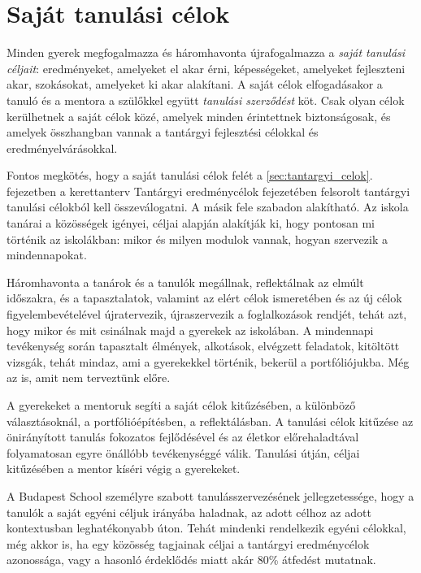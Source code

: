\section{Saját tanulási célok}

Minden gyerek megfogalmazza és háromhavonta újrafogalmazza a \emph{saját
  tanulási céljait}: eredményeket, amelyeket el akar érni, képességeket,
amelyeket fejleszteni akar, szokásokat, amelyeket ki akar alakítani. A saját
célok elfogadásakor a tanuló és a mentora a szülőkkel együtt \emph{tanulási
  szerződést} köt. Csak olyan célok kerülhetnek a saját célok közé, amelyek
minden érintettnek biztonságosak, és amelyek összhangban vannak a tantárgyi
fejlesztési célokkal és eredményelvárásokkal.

Fontos megkötés, hogy a saját tanulási célok felét a 
\ifkerettanterv
\ref{sec:tantargyi_celok}. fejezetben 
\else
a kerettanterv Tantárgyi eredménycélok fejezetében
\fi
felsorolt tantárgyi tanulási célokból kell összeválogatni. A másik
fele szabadon alakítható. Az iskola tanárai a közösségek igényei, céljai
alapján alakítják ki, hogy pontosan mi történik az iskolákban: mikor és milyen
modulok vannak, hogyan szervezik a mindennapokat.

Háromhavonta a tanárok és a tanulók megállnak, reflektálnak az elmúlt
időszakra, és a tapasztalatok, valamint az elért célok ismeretében és az új
célok figyelembevételével újratervezik, újraszervezik a foglalkozások rendjét,
tehát azt, hogy mikor és mit csinálnak majd a gyerekek az iskolában.
A mindennapi tevékenység során tapasztalt élmények, alkotások, elvégzett
feladatok, kitöltött vizsgák, tehát mindaz, ami a gyerekekkel történik, bekerül
a portfóliójukba. Még az is, amit nem terveztünk előre.

A gyerekeket a mentoruk segíti a saját célok kitűzésében, a különböző
választásoknál, a portfólióépítésben, a reflektálásban. A tanulási célok
kitűzése az önirányított tanulás fokozatos fejlődésével és az életkor
előrehaladtával folyamatosan egyre önállóbb tevékenységgé válik. Tanulási
útján, céljai kitűzésében a mentor kíséri végig a gyerekeket.

A Budapest School személyre szabott tanulásszervezésének jellegzetessége, hogy
a tanulók a saját egyéni céljuk irányába haladnak, az adott célhoz az adott
kontextusban leghatékonyabb úton. Tehát mindenki rendelkezik egyéni célokkal,
még akkor is, ha egy közösség tagjainak céljai a tantárgyi eredménycélok
azonossága, vagy a hasonló érdeklődés miatt akár  80\% átfedést mutatnak.

